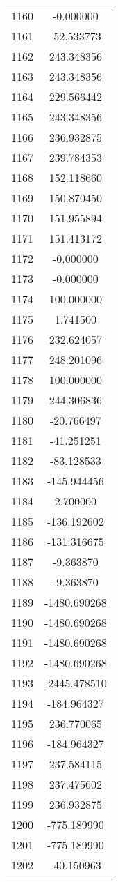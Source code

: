 \documentclass[12pt]{article}
\begin{document}
\begin{longtable}{@{}cc@{}}
1160 & -0.000000 \\
1161 & -52.533773 \\
1162 & 243.348356 \\
1163 & 243.348356 \\
1164 & 229.566442 \\
1165 & 243.348356 \\
1166 & 236.932875 \\
1167 & 239.784353 \\
1168 & 152.118660 \\
1169 & 150.870450 \\
1170 & 151.955894 \\
1171 & 151.413172 \\
1172 & -0.000000 \\
1173 & -0.000000 \\
1174 & 100.000000 \\
1175 & 1.741500 \\
1176 & 232.624057 \\
1177 & 248.201096 \\
1178 & 100.000000 \\
1179 & 244.306836 \\
1180 & -20.766497 \\
1181 & -41.251251 \\
1182 & -83.128533 \\
1183 & -145.944456 \\
1184 & 2.700000 \\
1185 & -136.192602 \\
1186 & -131.316675 \\
1187 & -9.363870 \\
1188 & -9.363870 \\
1189 & -1480.690268 \\
1190 & -1480.690268 \\
1191 & -1480.690268 \\
1192 & -1480.690268 \\
1193 & -2445.478510 \\
1194 & -184.964327 \\
1195 & 236.770065 \\
1196 & -184.964327 \\
1197 & 237.584115 \\
1198 & 237.475602 \\
1199 & 236.932875 \\
1200 & -775.189990 \\
1201 & -775.189990 \\
1202 & -40.150963 \\

\end{longtable}
\end{document}
